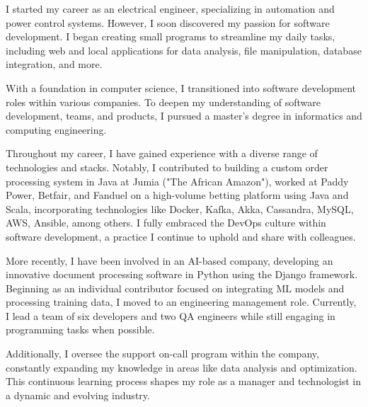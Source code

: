 \documentclass[letterpaper,11pt]{article}
\newlength{\outerbordwidth}
\newcommand{\resheading}[1]{\vspace{4pt}
  \parbox{\textwidth}{\setlength{\FrameSep}{\outerbordwidth}
    \begin{shaded}
\setlength{\fboxsep}{0pt}\framebox[\textwidth][l]{\setlength{\fboxsep}{4pt}\fcolorbox{shadecolorB}{shadecolorB}{\textbf{\sffamily{\mbox{~}\makebox[6.762in][l]{\large #1} \vphantom{p\^{E}}}}}}
    \end{shaded}
  }\vspace{4pt}
}
\newcommand{\cvevent}[1]{\vspace{5pt}
  \parbox{\textwidth}{\setlength{\FrameSep}{\outerbordwidth}
    \begin{shaded}
        \setlength{\fboxsep}{0pt}{\setlength{\fboxsep}{4pt}\fcolorbox{sectcol}{sectcol}{\textbf{\sffamily{\mbox{~}\makebox[6.762in][l]{\textcolor{white}{\large \uppercase{#1}}} \vphantom{p\^{E}}}}}}
    \end{shaded}
  }\vspace{40pt}
}
\begin{document}
\vspace{0.2in}		%


\resheading{\faUser\hspace{4pt}Summary}
\begin{center}
	\parbox{6.762in}{I started my career as an electrical engineer, specializing in automation and power control systems. However, I soon discovered my passion for software development. I began creating small programs to streamline my daily tasks, including web and local applications for data analysis, file manipulation, database integration, and more.
    \linebreak

    With a foundation in computer science, I transitioned into software development roles within various companies. To deepen my understanding of software development, teams, and products, I pursued a master's degree in informatics and computing engineering.
    \linebreak

    Throughout my career, I have gained experience with a diverse range of technologies and stacks. Notably, I contributed to building a custom order processing system in Java at Jumia ("The African Amazon"), worked at Paddy Power, Betfair, and Fanduel on a high-volume betting platform using Java and Scala, incorporating technologies like Docker, Kafka, Akka, Cassandra, MySQL, AWS, Ansible, among others. I fully embraced the DevOps culture within software development, a practice I continue to uphold and share with colleagues.
    \linebreak

    More recently, I have been involved in an AI-based company, developing an innovative document processing software in Python using the Django framework. Beginning as an individual contributor focused on integrating ML models and processing training data, I moved to an engineering management role. Currently, I lead a team of six developers and two QA engineers while still engaging in programming tasks when possible.
    \linebreak

    Additionally, I oversee the support on-call program within the company, constantly expanding my knowledge in areas like data analysis and optimization. This continuous learning process shapes my role as a manager and technologist in a dynamic and evolving industry.}
\end{center}
\end{document}
